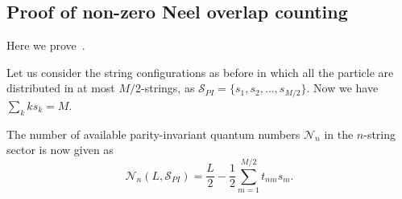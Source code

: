 \documentclass[11pt]{iopart}
\begin{document}
\subsection{Proof of non-zero Neel overlap counting}

Here we prove~. 

Let us consider the string configurations as before in which all the particle are 
distributed in at most $M/2$-strings, as ${\mathcal S}_{PI}=\{s_1,s_2,\dots,s_{M/2}\}$. 
Now we have $\sum_k ks_k=M$. 

The number of available parity-invariant quantum numbers ${\mathcal N}_n$ in the 
$n$-string sector is now given as 
%
\begin{equation}
{\mathcal N}_n(L,{\mathcal S}_{PI})=\frac{L}{2}-\frac{1}{2}\sum_{m=1}^{M/2}t_{nm}s_m.
\end{equation}
%
\end{document}
